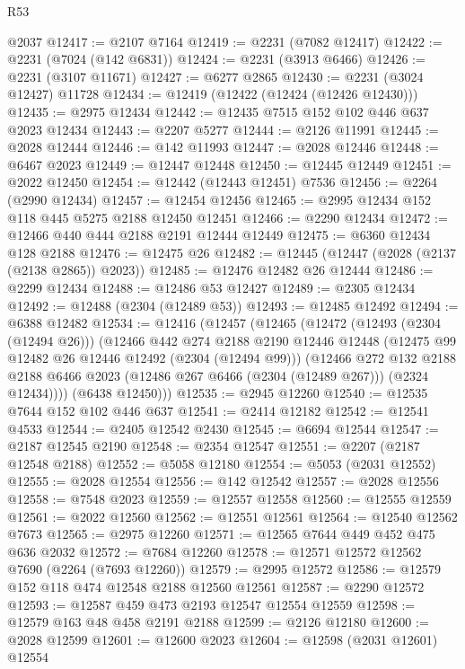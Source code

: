 \begin{lexlean}{R53}
\begin{coremodule}
    @2037
@12417 := @2107 @7164
@12419 := @2231 (@7082 @12417)
@12422 := @2231 (@7024 (@142 @6831))
@12424 := @2231 (@3913 @6466)
@12426 := @2231 (@3107 @11671)
@12427 := @6277 @2865
@12430 := @2231 (@3024 @12427) @11728
@12434 := @12419 (@12422 (@12424 (@12426 @12430)))
@12435 := @2975 @12434
@12442 := @12435 @7515 @152 @102 @446 @637 @2023 @12434
@12443 := @2207 @5277
@12444 := @2126 @11991
@12445 := @2028 @12444
@12446 := @142 @11993
@12447 := @2028 @12446
@12448 := @6467 @2023
@12449 := @12447 @12448
@12450 := @12445 @12449
@12451 := @2022 @12450
@12454 := @12442 (@12443 @12451) @7536
@12456 := @2264 (@2990 @12434)
@12457 := @12454 @12456
@12465 := @2995 @12434 @152 @118 @445 @5275 @2188 @12450 @12451
@12466 := @2290 @12434
@12472 := @12466 @440 @444 @2188 @2191 @12444 @12449
@12475 := @6360 @12434 @128 @2188
@12476 := @12475 @26
@12482 := @12445 (@12447 (@2028 (@2137 (@2138 @2865)) @2023))
@12485 := @12476 @12482 @26 @12444
@12486 := @2299 @12434
@12488 := @12486 @53 @12427
@12489 := @2305 @12434
@12492 := @12488 (@2304 (@12489 @53))
@12493 := @12485 @12492
@12494 := @6388 @12482
@12534 := @12416
    (@12457
      (@12465
        (@12472
          (@12493 (@2304 (@12494 @26)))
          (@12466
            @442
            @274
            @2188
            @2190
            @12446
            @12448
            (@12475 @99 @12482 @26 @12446 @12492 (@2304 (@12494 @99)))
            (@12466
              @272
              @132
              @2188
              @2188
              @6466
              @2023
              (@12486 @267 @6466 (@2304 (@12489 @267)))
              (@2324 @12434))))
        (@6438 @12450)))
@12535 := @2945 @12260
@12540 := @12535 @7644 @152 @102 @446 @637
@12541 := @2414 @12182
@12542 := @12541 @4533
@12544 := @2405 @12542 @2430
@12545 := @6694 @12544
@12547 := @2187 @12545 @2190
@12548 := @2354 @12547
@12551 := @2207 (@2187 @12548 @2188)
@12552 := @5058 @12180
@12554 := @5053 (@2031 @12552)
@12555 := @2028 @12554
@12556 := @142 @12542
@12557 := @2028 @12556
@12558 := @7548 @2023
@12559 := @12557 @12558
@12560 := @12555 @12559
@12561 := @2022 @12560
@12562 := @12551 @12561
@12564 := @12540 @12562 @7673
@12565 := @2975 @12260
@12571 := @12565 @7644 @449 @452 @475 @636 @2032
@12572 := @7684 @12260
@12578 := @12571 @12572 @12562 @7690 (@2264 (@7693 @12260))
@12579 := @2995 @12572
@12586 := @12579 @152 @118 @474 @12548 @2188 @12560 @12561
@12587 := @2290 @12572
@12593 := @12587 @459 @473 @2193 @12547 @12554 @12559
@12598 := @12579 @163 @48 @458 @2191 @2188
@12599 := @2126 @12180
@12600 := @2028 @12599
@12601 := @12600 @2023
@12604 := @12598 (@2031 @12601) @12554

\end{coremodule}
\end{lexlean}
